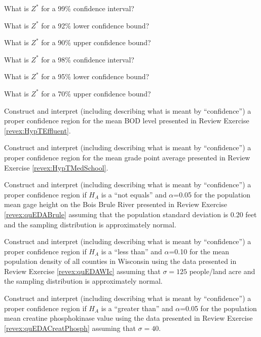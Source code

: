 \documentclass[10pt,openany]{book}\usepackage[]{graphicx}\usepackage[]{color}
\begin{document}
\begin{exsection}
  \item \label{revex:CI99zstar} \rhw{} What is $Z^{*}$ for a 99\% confidence interval? 
  \item \label{revex:CI92zstar} \rhw{} What is $Z^{*}$ for a 92\% lower confidence bound? 
  \item \label{revex:CI90zstar} \rhw{} What is $Z^{*}$ for a 90\% upper confidence bound? 
  \item \label{revex:CI98zstar} \rhw{} What is $Z^{*}$ for a 98\% confidence interval? 
  \item \label{revex:CI95zstar} \rhw{} What is $Z^{*}$ for a 95\% lower confidence bound? 
  \item \label{revex:CI70zstar} \rhw{} What is $Z^{*}$ for a 70\% upper confidence bound? 
  \item \label{revex:CIEffluent} \rhw{} Construct and interpret (including describing what is meant by ``confidence'') a proper confidence region for the mean BOD level presented in Review Exercise \ref{revex:HypTEffluent}.  
  \item \label{revex:CIMedSchool} \rhw{} Construct and interpret (including describing what is meant by ``confidence'') a proper confidence region for the mean grade point average presented in Review Exercise \ref{revex:HypTMedSchool}. 
  \item \label{revex:CIBrule} \rhw{} Construct and interpret (including describing what is meant by ``confidence'') a proper confidence region if $H_{A}$ is a ``not equals'' and $\alpha$=0.05 for the population mean gage height on the Bois Brule River presented in Review Exercise \ref{revex:quEDABrule} assuming that the population standard deviation is 0.20 feet and the sampling distribution is approximately normal. 
  \item \label{revex:CIWIc} \rhw{} Construct and interpret (including describing what is meant by ``confidence'') a proper confidence region if $H_{A}$ is a ``less than'' and $\alpha$=0.10 for the mean population density of all counties in Wisconsin using the data presented in Review Exercise \ref{revex:quEDAWIc} assuming that $\sigma=125$ people/land acre and the sampling distribution is approximately normal. 
  \item \label{revex:CICreatPhosph} \rhw{} Construct and interpret (including describing what is meant by ``confidence'') a proper confidence region if $H_{A}$ is a ``greater than'' and $\alpha$=0.05 for the population mean creatine phosphokinase value using the data presented in Review Exercise \ref{revex:quEDACreatPhosph} assuming that $\sigma=40$. 

\end{exsection}
\end{document}
